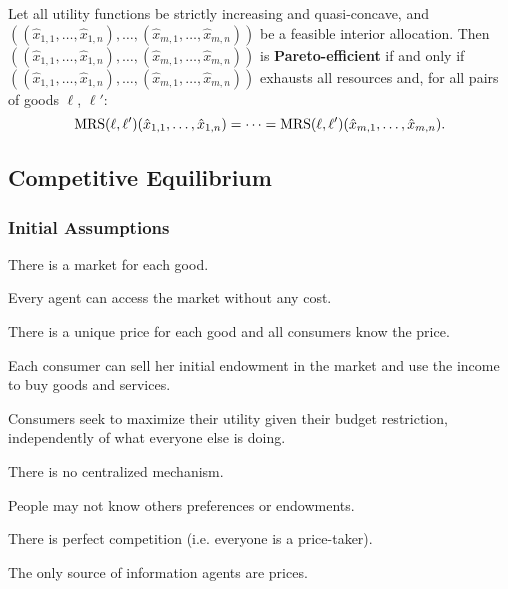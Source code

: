 \documentclass[8pt,a4paper]{extarticle}
\begin{document}
\begin{multicols}{3}
  \begin{boxtheo}
    Let all utility functions be strictly increasing and quasi-concave, and	$((\hat{x}_{1,1}, \ldots, \hat{x}_{1, n}), \ldots, (\hat{x}_{m, 1}, \ldots, \hat{x}_{m, n}))$ be a feasible interior allocation. Then $((\hat{x}_{1,1}, \ldots, \hat{x}_{1, n}), \ldots, (\hat{x}_{m, 1}, \ldots, \hat{x}_{m, n}))$ is \textbf{Pareto-efficient} if and only if $((\hat{x}_{1,1}, \ldots, \hat{x}_{1, n}), \ldots, (\hat{x}_{m, 1}, \ldots, \hat{x}_{m, n}))$ exhausts all resources and, for all pairs of goods $\ell$, $\ell'$:
    \[
      \text{\normalfont MRS}(\ell, \ell') (\hat{x}_{1,1}, \ldots, \hat{x}_{1, n}) = \cdots = \text{\normalfont MRS}(\ell, \ell') (\hat{x}_{m,1}, \ldots, \hat{x}_{m, n})
      .\]
  \end{boxtheo}

  \subsection{Competitive Equilibrium}

  \subsubsection*{Initial Assumptions}

  \begin{bulletlist}
    \item There is a market for each good.
    \item Every agent can access the market without any cost.
    \item There is a unique price for each good and all consumers know the price.
    \item Each consumer can sell her initial endowment in the market and use the income to buy goods and services.
    \item Consumers seek to maximize their utility given their budget restriction, independently of what everyone else is doing.
    \item There is no centralized mechanism.
    \item People may not know others preferences or endowments.
    \item There is perfect competition (i.e. everyone is a price-taker).
    \item The only source of information agents are prices.
  \end{bulletlist}


\end{multicols}
\end{document}
